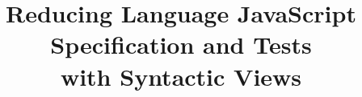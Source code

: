 \documentclass[sigconf,review,anonymous]{acmart}
\begin{document}
\title[Reducing Language JavaScript Specification and Tests
with Syntactic Views]
{Reducing Language JavaScript Specification and Tests\\
with Syntactic Views}

% 
% 
% 



%


\maketitle












\balance


\appendix


\end{document}
